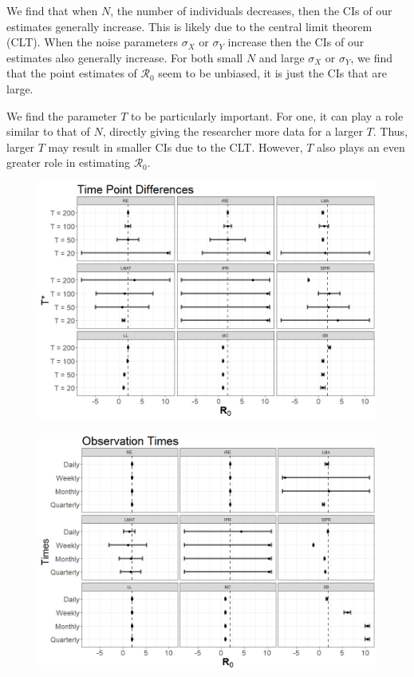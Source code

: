 \documentclass[12pt]{article}
\newcommand{\rr}{\ensuremath{\mathcal{R}_0}}
\begin{document}

We find that when $N$, the number of individuals decreases, then the CIs of our estimates generally increase.  This is likely due to the central limit theorem (CLT).  When the noise parameters $\sigma_X$ or $\sigma_Y$ increase then the CIs of our estimates also generally increase.  For both small $N$ and large $\sigma_X$ or $\sigma_Y$, we find that the point estimates of $\rr$ seem to be unbiased, it is just the CIs that are large.

We find the parameter $T$ to be particularly important.  For one, it can play a role similar to that of $N$, directly giving the researcher more data for a larger $T$.  Thus, larger $T$ may result in smaller CIs due to the CLT.  However, $T$ also plays an even greater role in estimating $\rr$.

\begin{figure}[H]
	\centering
	\includegraphics[scale=0.5]{images/timediff.jpeg}
	\caption{}\label{fig:timediff}
\end{figure}

\begin{figure}[H]
	\centering
	\includegraphics[scale=0.5]{images/obs.jpeg}
	\caption{}\label{fig:obs}
\end{figure}
\end{document}

